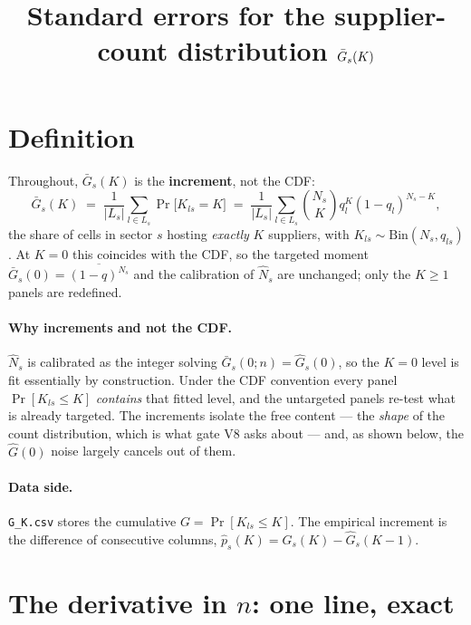 \documentclass[11pt]{article}
\title{Standard errors for the supplier-count distribution $\Gbar_s(K)$}
\date{}
\newcommand{\Gbar}{\bar{G}}
\newcommand{\Ghat}{\hat{G}}
\newcommand{\Nhat}{\hat{N}}
\begin{document}
\maketitle

\section{Definition}

Throughout, $\Gbar_s(K)$ is the \textbf{increment}, not the CDF:
\begin{equation}
\Gbar_s(K)\;=\;\frac{1}{|L_s|}\sum_{l\in L_s}\Pr\!\big[K_{ls}=K\big]
\;=\;\frac{1}{|L_s|}\sum_{l\in L_s}\binom{N_s}{K} q_l^{K}(1-q_l)^{N_s-K},
\end{equation}
the share of cells in sector $s$ hosting \emph{exactly} $K$ suppliers, with
$K_{ls}\sim\mathrm{Bin}(N_s,q_{ls})$. At $K=0$ this coincides with the CDF, so the
targeted moment $\Gbar_s(0)=\overline{(1-q)^{N_s}}$ and the calibration of $\Nhat_s$ are
unchanged; only the $K\ge1$ panels are redefined.

\paragraph{Why increments and not the CDF.}
$\Nhat_s$ is calibrated as the integer solving $\Gbar_s(0;n)=\Ghat_s(0)$, so the $K=0$ level
is fit essentially by construction. Under the CDF convention every panel
$\Pr[K_{ls}\le K]$ \emph{contains} that fitted level, and the untargeted panels re-test what
is already targeted. The increments isolate the free content --- the \emph{shape} of the
count distribution, which is what gate V8 asks about --- and, as shown below, the $\Ghat(0)$
noise largely cancels out of them.

\paragraph{Data side.}
\texttt{G\_K.csv} stores the cumulative $G=\Pr[K_{ls}\le K]$. The empirical increment is the
difference of consecutive columns, $\hat p_s(K)=\Ghat_s(K)-\Ghat_s(K-1)$.

\section{The derivative in $n$: one line, exact}
\end{document}
